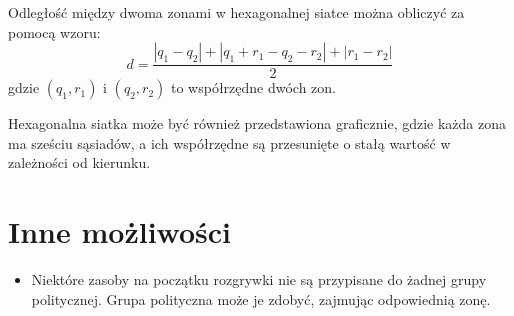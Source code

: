 Odległość między dwoma zonami w hexagonalnej siatce można obliczyć za pomocą wzoru:
\[
d = \frac{|q_1 - q_2| + |q_1 + r_1 - q_2 - r_2| + |r_1 - r_2|}{2}
\]
gdzie \( (q_1, r_1) \) i \( (q_2, r_2) \) to współrzędne dwóch zon.

Hexagonalna siatka może być również przedstawiona graficznie, gdzie każda zona ma sześciu sąsiadów, a ich współrzędne są przesunięte o stałą wartość w zależności od kierunku.


\section*{Inne możliwości}

\begin{itemize}
    \item Niektóre zasoby na początku rozgrywki nie są przypisane do żadnej grupy politycznej. Grupa polityczna może je zdobyć, zajmując odpowiednią zonę.
\end{itemize}